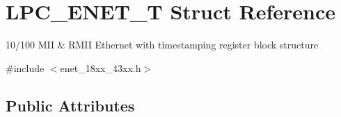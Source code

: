 \hypertarget{struct_l_p_c___e_n_e_t___t}{}\section{L\+P\+C\+\_\+\+E\+N\+E\+T\+\_\+T Struct Reference}
\label{struct_l_p_c___e_n_e_t___t}


10/100 M\+II \& R\+M\+II Ethernet with timestamping register block structure  




{\ttfamily \#include $<$enet\+\_\+18xx\+\_\+43xx.\+h$>$}

\subsection*{Public Attributes}
